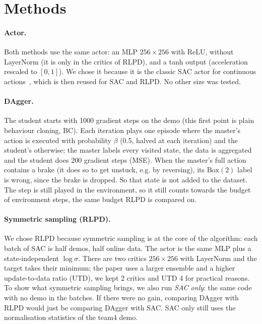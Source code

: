 \documentclass[10pt,a4paper]{article}
\begin{document}
\section{Methods}
\label{sec:methods}

\paragraph{Actor.}
Both methods use the same actor: an MLP $256{\times}256$ with ReLU, without LayerNorm (it is only in the critics of RLPD), and a tanh output (acceleration rescaled to $[0,1]$).
We chose it because it is the classic SAC actor for continuous actions~\cite{haarnoja2018sac}, which is then reused for SAC and RLPD. No other size was tested.

\paragraph{DAgger.}
The student starts with 1000 gradient steps on the demo (this first point is plain behaviour cloning, BC). Each iteration plays one episode where the master's action is executed with probability $\beta$ (0.5, halved at each iteration) and the student's otherwise; the master labels every visited state, the data is aggregated and the student does 200 gradient steps (MSE).
When the master's full action contains a brake (it does so to get unstuck, e.g. by reversing), its $\mathrm{Box}(2)$ label is wrong, since the brake is dropped. So that state is not added to the dataset. The step is still played in the environment, so it still counts towards the budget of environment steps, the same budget RLPD is compared on.

\paragraph{Symmetric sampling (RLPD).}
We chose RLPD because symmetric sampling is at the core of the algorithm: each batch of SAC is half demos, half online data.
The actor is the same MLP plus a state-independent $\log\sigma$. There are two critics $256{\times}256$ with LayerNorm and the target takes their minimum; the paper uses a larger ensemble and a higher update-to-data ratio (UTD), we kept 2 critics and UTD 4 for practical reasons.
To show what symmetric sampling brings, we also run \emph{SAC only}: the same code with no demo in the batches. If there were no gain, comparing DAgger with RLPD would just be comparing DAgger with SAC.
SAC only still uses the normalisation statistics of the team4 demo.
\end{document}
